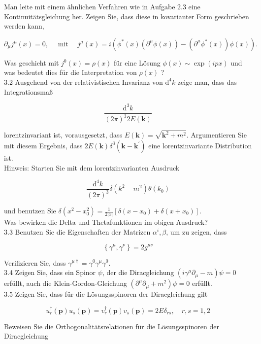 \documentclass[10pt, letterpaper]{article}
\begin{document}
Man leite mit einem ähnlichen Verfahren wie in Aufgabe 2.3 eine Kontinuitätsgleichung her. Zeigen Sie, dass diese in kovarianter Form geschrieben werden kann,

$$
\partial_{\mu} j^{\mu}(x)=0, \quad \text { mit } \quad j^{\mu}(x)=i\left(\phi^{*}(x)\left(\partial^{\mu} \phi(x)\right)-\left(\partial^{\mu} \phi^{*}(x)\right) \phi(x)\right) .
$$

Was geschieht mit $j^{0}(x)=\rho(x)$ für eine Lösung $\phi(x) \sim \exp (i p x)$ und was bedeutet dies für die Interpretation von $\rho(x)$ ?\\
3.2 Ausgehend von der relativistischen Invarianz von $\mathrm{d}^{4} k$ zeige man, dass das Integrationsmaß

$$
\frac{\mathrm{d}^{3} k}{(2 \pi)^{3} 2 E(\mathbf{k})}
$$

lorentzinvariant ist, vorausgesetzt, dass $E(\mathbf{k})=\sqrt{\mathbf{k}^{2}+m^{2}}$. Argumentieren Sie mit diesem Ergebnis, dass $2 E(\mathbf{k}) \delta^{3}\left(\mathbf{k}-\mathbf{k}^{\prime}\right)$ eine lorentzinvariante Distribution ist.\\
Hinweis: Starten Sie mit dem lorentzinvarianten Ausdruck

$$
\frac{\mathrm{d}^{4} k}{(2 \pi)^{3}} \delta\left(k^{2}-m^{2}\right) \theta\left(k_{0}\right)
$$

und benutzen Sie $\delta\left(x^{2}-x_{0}^{2}\right)=\frac{1}{2|x|}\left[\delta\left(x-x_{0}\right)+\delta\left(x+x_{0}\right)\right]$.\\
Was bewirken die Delta-und Thetafunktionen im obigen Ausdruck?\\
3.3 Benutzen Sie die Eigenschaften der Matrizen $\alpha^{i}, \beta$, um zu zeigen, dass

$$
\left\{\gamma^{\mu}, \gamma^{\nu}\right\}=2 g^{\mu \nu}
$$

Verifizieren Sie, dass $\gamma^{\mu \dagger}=\gamma^{0} \gamma^{\mu} \gamma^{0}$.\\
3.4 Zeigen Sie, dass ein Spinor $\psi$, der die Diracgleichung $\left(i \gamma^{\mu} \partial_{\mu}-m\right) \psi=0$ erfüllt, auch die Klein-Gordon-Gleichung $\left(\partial^{\mu} \partial_{\mu}+m^{2}\right) \psi=0$ erfüllt.\\
3.5 Zeigen Sie, dass für die Lösungsspinoren der Diracgleichung gilt

$$
u_{r}^{\dagger}(\mathbf{p}) u_{s}(\mathbf{p})=v_{r}^{\dagger}(\mathbf{p}) v_{s}(\mathbf{p})=2 E \delta_{r s}, \quad r, s=1,2
$$

Beweisen Sie die Orthogonalitätsrelationen für die Lösungsspinoren der Diracgleichung
\end{document}
